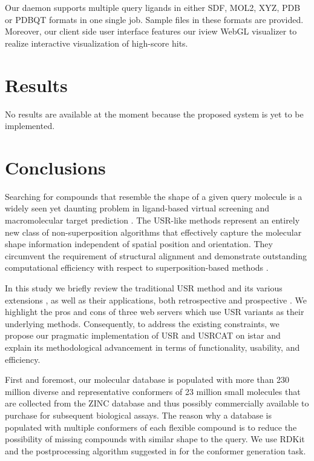 Our daemon supports multiple query ligands in either SDF, MOL2, XYZ, PDB or PDBQT formats in one single job. Sample files in these formats are provided. Moreover, our client side user interface features our iview \citep{1366} WebGL visualizer to realize interactive visualization of high-score hits.

\section{Results}

No results are available at the moment because the proposed system is yet to be implemented.

\section{Conclusions}

Searching for compounds that resemble the shape of a given query molecule is a widely seen yet daunting problem in ligand-based virtual screening \citep{1332,1380} and macromolecular target prediction \citep{1407,1408,1402}. The USR-like methods \citep{1379,1338,1331} represent an entirely new class of non-superposition algorithms that effectively capture the molecular shape information independent of spatial position and orientation. They circumvent the requirement of structural alignment and demonstrate outstanding computational efficiency with respect to superposition-based methods \citep{1440,887,1439}.

In this study we briefly review the traditional USR method \citep{1379} and its various extensions \citep{1333,1436,1437,1334,1335,1337,1338,1331,1407,1408}, as well as their applications, both retrospective \citep{1332,1331} and prospective \citep{1380}. We highlight the pros and cons of three web servers \citep{1436,1437,1408} which use USR variants as their underlying methods. Consequently, to address the existing constraints, we propose our pragmatic implementation of USR \citep{1379} and USRCAT \citep{1331} on istar \citep{1362} and explain its methodological advancement in terms of functionality, usability, and efficiency.

First and foremost, our molecular database is populated with more than 230 million diverse and representative conformers of 23 million small molecules that are collected from the ZINC database \citep{532,1178} and thus possibly commercially available to purchase for subsequent biological assays. The reason why a database is populated with multiple conformers of each flexible compound is to reduce the possibility of missing compounds with similar shape to the query. We use RDKit and the postprocessing algorithm suggested in \citep{1127} for the conformer generation task.

